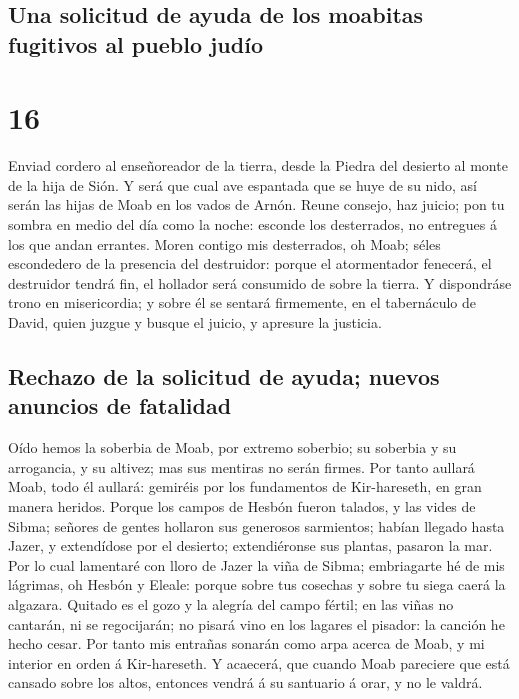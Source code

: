 \hypertarget{una-solicitud-de-ayuda-de-los-moabitas-fugitivos-al-pueblo-juduxedo}{%
\subsection{Una solicitud de ayuda de los moabitas fugitivos al pueblo
judío}\label{una-solicitud-de-ayuda-de-los-moabitas-fugitivos-al-pueblo-juduxedo}}

\hypertarget{section-15}{%
\section{16}\label{section-15}}

 Enviad cordero al enseñoreador de la tierra, desde la
Piedra del desierto al monte de la hija de Sión.  Y será que
cual ave espantada que se huye de su nido, así serán las hijas de Moab
en los vados de Arnón.  Reune consejo, haz juicio; pon tu
sombra en medio del día como la noche: esconde los desterrados, no
entregues á los que andan errantes.  Moren contigo mis
desterrados, oh Moab; séles escondedero de la presencia del destruidor:
porque el atormentador fenecerá, el destruidor tendrá fin, el hollador
será consumido de sobre la tierra.  Y dispondráse trono en
misericordia; y sobre él se sentará firmemente, en el tabernáculo de
David, quien juzgue y busque el juicio, y apresure la justicia.

\hypertarget{rechazo-de-la-solicitud-de-ayuda-nuevos-anuncios-de-fatalidad}{%
\subsection{Rechazo de la solicitud de ayuda; nuevos anuncios de
fatalidad}\label{rechazo-de-la-solicitud-de-ayuda-nuevos-anuncios-de-fatalidad}}

 Oído hemos la soberbia de Moab, por extremo soberbio; su
soberbia y su arrogancia, y su altivez; mas sus mentiras no serán
firmes.  Por tanto aullará Moab, todo él aullará: gemiréis
por los fundamentos de Kir-hareseth, en gran manera heridos.
 Porque los campos de Hesbón fueron talados, y las vides de
Sibma; señores de gentes hollaron sus generosos sarmientos; habían
llegado hasta Jazer, y extendídose por el desierto; extendiéronse sus
plantas, pasaron la mar.  Por lo cual lamentaré con lloro de
Jazer la viña de Sibma; embriagarte hé de mis lágrimas, oh Hesbón y
Eleale: porque sobre tus cosechas y sobre tu siega caerá la algazara.
 Quitado es el gozo y la alegría del campo fértil; en las
viñas no cantarán, ni se regocijarán; no pisará vino en los lagares el
pisador: la canción he hecho cesar.  Por tanto mis entrañas
sonarán como arpa acerca de Moab, y mi interior en orden á Kir-hareseth.
 Y acaecerá, que cuando Moab pareciere que está cansado
sobre los altos, entonces vendrá á su santuario á orar, y no le valdrá.

